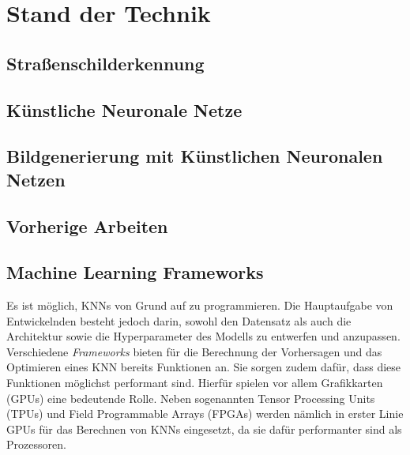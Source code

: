 \chapter{Stand der Technik}
\section{Straßenschilderkennung}


\section{Künstliche Neuronale Netze}


\section{Bildgenerierung mit Künstlichen Neuronalen Netzen}


%

\section{Vorherige Arbeiten}


\section{Machine Learning Frameworks}


Es ist möglich, \acp{KNN} von Grund auf zu programmieren. Die Hauptaufgabe von Entwickelnden besteht jedoch darin, sowohl den Datensatz als auch die Architektur sowie die Hyperparameter des Modells zu entwerfen und anzupassen. Verschiedene \emph{Frameworks} bieten für die Berechnung der Vorhersagen und das Optimieren eines \ac{KNN} bereits Funktionen an. Sie sorgen zudem dafür, dass diese Funktionen möglichst performant sind. Hierfür spielen vor allem Grafikkarten (\acp{GPU}) eine bedeutende Rolle. Neben sogenannten Tensor Processing Units (TPUs) und Field Programmable Arrays (FPGAs) werden nämlich in erster Linie \acp{GPU} für das Berechnen von \acp{KNN} eingesetzt, da sie dafür performanter sind als Prozessoren. \cite{frameworks}

